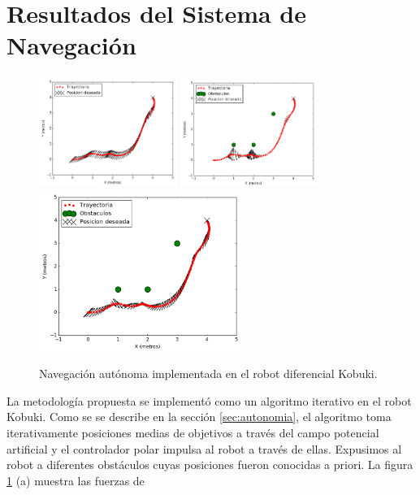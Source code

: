 \section{Resultados del Sistema de Navegación}
\begin{figure}%
  \centering \footnotesize
  \includegraphics[width=0.40\textwidth]{images/attr_kbki.png}
  \includegraphics[width=0.40\textwidth]{images/rep_kbki.png}
  \includegraphics[width=0.60\textwidth]{images/nav_kbki.png}
  \captionsetup{font=footnotesize}
  \caption{Navegación autónoma implementada en el robot diferencial Kobuki.}
  \label{f:kbki_APF}
\end{figure}
La metodología propuesta se implementó como un algoritmo iterativo en el robot Kobuki. 
Como se se describe en la sección \ref{sec:autonomia}, el algoritmo toma iterativamente 
posiciones medias de objetivos a través del campo potencial artificial y el controlador 
polar impulsa al robot a través de ellas. Expusimos al robot a diferentes obstáculos cuyas 
posiciones fueron conocidas a priori. La figura \ref{f:kbki_APF} (a) muestra las fuerzas de 
